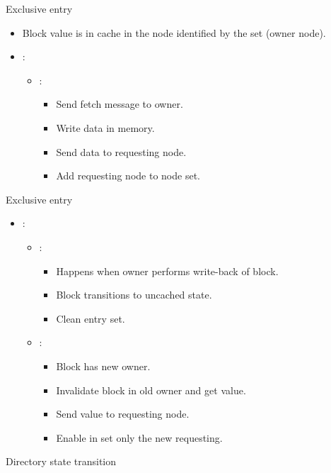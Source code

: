 \begin{frame}[t]{Exclusive entry}
\begin{itemize}
  \item Block value is in cache in the node identified by the set (owner node).

  \item {}:
    \begin{itemize}
      \item {}:
        \begin{itemize}
          \item Send fetch message to owner.
          \item Write data in memory.
          \item Send data to requesting node.
          \item Add requesting node to node set.
        \end{itemize}
    \end{itemize}
\end{itemize}
\end{frame}

\begin{frame}[t]{Exclusive entry}
\begin{itemize}
  \item {}:
    \begin{itemize}
      \item {}:
        \begin{itemize}
          \item Happens when owner performs write-back of block.
          \item Block transitions to uncached state.
          \item Clean entry set.
        \end{itemize}
      \item {}:
        \begin{itemize}
          \item Block has new owner.
          \item Invalidate block in old owner and get value.
          \item Send value to requesting node.
          \item Enable in set only the new requesting.
        \end{itemize}
    \end{itemize}
\end{itemize}
\end{frame}

\begin{frame}[t]{Directory state transition}
\makebox[\textwidth][c]{

}
\end{frame}

